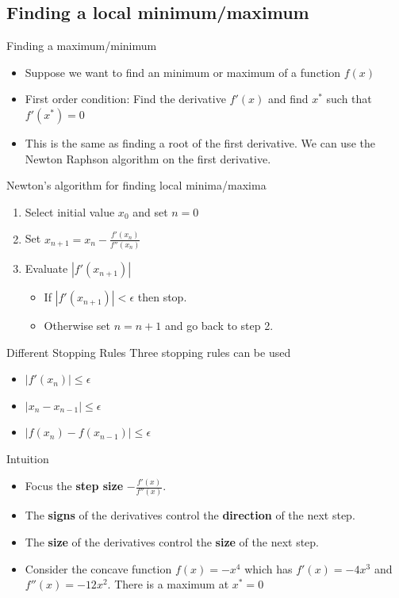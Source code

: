 \documentclass[10pt]{beamer}
\begin{document}
\subsection{Finding a local minimum/maximum}
\begin{frame}{Finding a maximum/minimum}
  \begin{itemize}
  \item Suppose we want to find an minimum or maximum of a function $f(x)$

  \item First order condition: Find the derivative $f'(x)$ and find $x^*$ such that $f'(x^*)=0$

  \item This is the same as finding a root of the first derivative.  We can use the Newton Raphson algorithm on the first derivative.
  \end{itemize}
\end{frame}
\begin{frame}{Newton's algorithm for finding local minima/maxima}
  \begin{enumerate}
  \item Select initial value $x_0$ and set $n=0$
  \item Set $x_{n+1}=x_{n}-\frac{f'(x_n)}{f''(x_n)}$
  \item Evaluate $|f'(x_{n+1})|$
    \begin{itemize}
    \item If $|f'(x_{n+1})|<\epsilon$ then stop.
    \item Otherwise set $n=n+1$ and go back to step 2.
    \end{itemize}
  \end{enumerate}
\end{frame}
\begin{frame}{Different Stopping Rules}
  Three stopping rules can be used

  \begin{itemize}
  \item $|f'(x_{n})|\leq\epsilon$

  \item $|x_{n}-x_{n-1}|\leq\epsilon$

  \item $|f(x_{n})-f(x_{n-1})|\leq\epsilon$
  \end{itemize}
\end{frame}
\begin{frame}{Intuition}
  \begin{itemize}
  \item Focus the {\bf step size} $-\frac{f'(x)}{f''(x)}$.

  \item The {\bf signs} of the derivatives control the {\bf direction} of the next step.

  \item The {\bf size} of the derivatives control the {\bf size} of the next step.

  \item Consider the concave function $f(x)=-x^4$ which has $f'(x)=-4x^3$ and $f''(x)=-12x^2$. There is a maximum at $x^{*}=0$
  \end{itemize}
\end{frame}
\end{document}
